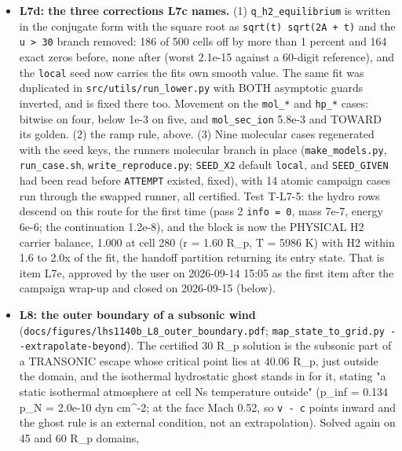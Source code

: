 \documentclass[english,a4paper]{my_memo}
\begin{document}
\begin{itemize}
  above, and found that the molecular \texttt{input.inp} files still carried the
  cold-march keys, so the molecular patch\textquotesingle s wind pass would have discarded
  the seed.
\item
  \textbf{L7d: the three corrections L7c names.} (1) \texttt{q\_h2\_equilibrium} is written
  in the conjugate form with the square root as \texttt{sqrt(t)\ sqrt(2A\ +\ t)} and
  the \texttt{u\ \textgreater{}\ 30} branch removed: 186 of 500 cells off by more than 1 percent
  and 164 exact zeros before, none after (worst 2.1e-15 against a 60-digit
  reference), and the \texttt{local} seed now carries the fit\textquotesingle s own smooth value.
  The same fit was duplicated in \texttt{src/utils/run\_lower.py} with BOTH
  asymptotic guards inverted, and is fixed there too. Movement on the \texttt{mol\_*}
  and \texttt{hp\_*} cases: bitwise on four, below 1e-3 on five, and \texttt{mol\_sec\_ion}
  5.8e-3 and TOWARD its golden. (2) the ramp rule, above. (3) Nine molecular
  cases regenerated with the seed keys, the runner\textquotesingle s molecular branch in
  place (\texttt{make\_models.py}, \texttt{run\_case.sh}, \texttt{write\_reproduce.py}; \texttt{SEED\_X2}
  default \texttt{local}, and \texttt{SEED\_GIVEN} had been read before \texttt{ATTEMPT} existed,
  fixed), with 14 atomic campaign cases run through the swapped runner, all
  certified. Test T-L7-5: the hydro rows descend on this route for the first
  time (pass 2 \texttt{info\ =\ 0}, mass 7e-7, energy 6e-6; the continuation 1.2e-8),
  and the block is now the PHYSICAL H2 carrier balance, 1.000 at cell 280
  (r = 1.60 R\_p, T = 5986 K) with H2 within 1.6 to 2.0x of the fit, the
  handoff partition returning its entry state. That is item L7e, approved by
  the user on 2026-09-14 15:05 as the first item after the campaign wrap-up
  and closed on 2026-09-15 (below).
\item
  \textbf{L8: the outer boundary of a subsonic wind}
  (\texttt{docs/figures/lhs1140b\_L8\_outer\_boundary.pdf};
  \texttt{map\_state\_to\_grid.py\ -\/-extrapolate-beyond}). The certified 30 R\_p solution
  is the subsonic part of a TRANSONIC escape whose critical point lies at
  40.06 R\_p, just outside the domain, and the isothermal hydrostatic ghost
  stands in for it, stating "a static isothermal atmosphere at cell N\textquotesingle s
  temperature outside" (p\_inf = 0.134 p\_N = 2.0e-10 dyn cm\^{}-2; at the face
  Mach 0.52, so \texttt{v\ -\ c} points inward and the ghost rule is an external
  condition, not an extrapolation). Solved again on 45 and 60 R\_p domains,

\end{itemize}
\end{document}

